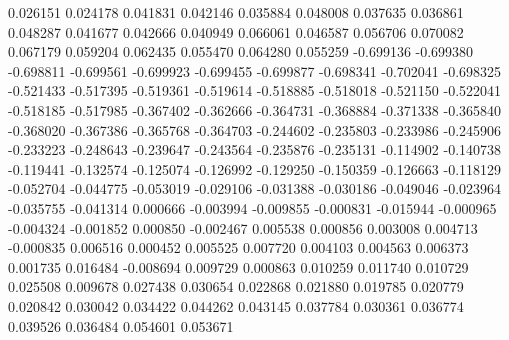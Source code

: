 0.026151
0.024178
0.041831
0.042146
0.035884
0.048008
0.037635
0.036861
0.048287
0.041677
0.042666
0.040949
0.066061
0.046587
0.056706
0.070082
0.067179
0.059204
0.062435
0.055470
0.064280
0.055259
-0.699136
-0.699380
-0.698811
-0.699561
-0.699923
-0.699455
-0.699877
-0.698341
-0.702041
-0.698325
-0.521433
-0.517395
-0.519361
-0.519614
-0.518885
-0.518018
-0.521150
-0.522041
-0.518185
-0.517985
-0.367402
-0.362666
-0.364731
-0.368884
-0.371338
-0.365840
-0.368020
-0.367386
-0.365768
-0.364703
-0.244602
-0.235803
-0.233986
-0.245906
-0.233223
-0.248643
-0.239647
-0.243564
-0.235876
-0.235131
-0.114902
-0.140738
-0.119441
-0.132574
-0.125074
-0.126992
-0.129250
-0.150359
-0.126663
-0.118129
-0.052704
-0.044775
-0.053019
-0.029106
-0.031388
-0.030186
-0.049046
-0.023964
-0.035755
-0.041314
0.000666
-0.003994
-0.009855
-0.000831
-0.015944
-0.000965
-0.004324
-0.001852
0.000850
-0.002467
0.005538
0.000856
0.003008
0.004713
-0.000835
0.006516
0.000452
0.005525
0.007720
0.004103
0.004563
0.006373
0.001735
0.016484
-0.008694
0.009729
0.000863
0.010259
0.011740
0.010729
0.025508
0.009678
0.027438
0.030654
0.022868
0.021880
0.019785
0.020779
0.020842
0.030042
0.034422
0.044262
0.043145
0.037784
0.030361
0.036774
0.039526
0.036484
0.054601
0.053671

